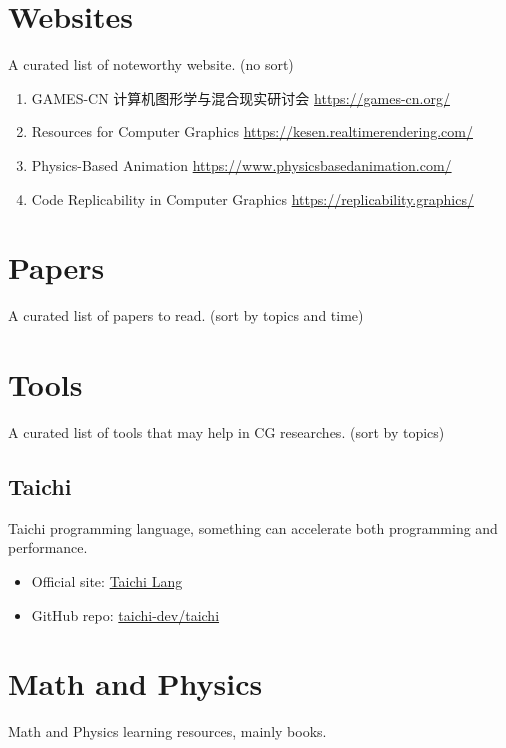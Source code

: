 \documentclass{article}
\begin{document}
\section{Websites}
\par A curated list of noteworthy website. (no sort)
\begin{enumerate}
    \item GAMES-CN 计算机图形学与混合现实研讨会 \newline \href{https://games-cn.org/}{https://games-cn.org/}
    \item Resources for Computer Graphics \newline \href{https://kesen.realtimerendering.com/}{https://kesen.realtimerendering.com/}
    \item Physics-Based Animation \newline \href{https://www.physicsbasedanimation.com/}{https://www.physicsbasedanimation.com/}
    \item Code Replicability in Computer Graphics \newline \href{https://replicability.graphics/}{https://replicability.graphics/}
\end{enumerate}

\section{Papers}
\par A curated list of papers to read. (sort by topics and time)

\section{Tools}
\par A curated list of tools that may help in CG researches. (sort by topics)
\subsection{Taichi}
\par Taichi programming language, something can accelerate both programming and performance.
\begin{itemize}
    \item Official site: \href{https://taichi.graphics/}{Taichi Lang}
    \item GitHub repo: \href{https://github.com/taichi-dev/taichi}{taichi-dev/taichi}
\end{itemize}

\section{Math and Physics}
\par Math and Physics learning resources, mainly books.
\end{document}
